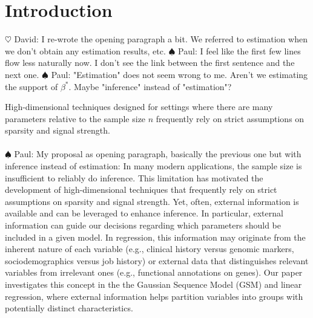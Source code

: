\documentclass[aos]{imsart}
\theoremstyle{plain}
\newcommand{\david}[1]{{\small{\color{blue} \sf $\heartsuit$ David: #1}}}
\newcommand{\paul}[1]{{\small{\color{green} \sf $\spadesuit$ Paul: #1}}}
\begin{document}
\section{Introduction} 

\david{I re-wrote the opening paragraph a bit. We referred to estimation when we don't obtain any estimation results, etc.} \paul{I feel like the first few lines flow less naturally now. I don't see the link between the first sentence and the next one.} \paul{"Estimation" does not seem wrong to me. Aren't we estimating the support of $\beta^*$. Maybe "inference" instead of "estimation"?}

High-dimensional techniques designed for settings where there are many parameters relative to the sample size $n$ frequently rely on strict assumptions on sparsity and signal strength.\\
\\
\paul{My proposal as opening paragraph, basically the previous one but with inference instead of estimation:}
In many modern applications, the sample size is insufficient to reliably do inference. This limitation has motivated the development of high-dimensional techniques that frequently rely on strict assumptions on sparsity and signal strength. Yet, often, external information is available and can be leveraged to enhance inference.
In particular, external information can guide our decisions regarding which parameters should be included in a given model. In regression, this information may originate from the inherent nature of each variable (e.g., clinical history versus genomic markers, sociodemographics versus job history) or external data that distinguishes relevant variables from irrelevant ones (e.g., functional annotations on genes). 
Our paper investigates this concept in the the Gaussian Sequence Model (GSM) and linear regression, where external information helps partition variables into groups with potentially distinct characteristics.
\end{document}
